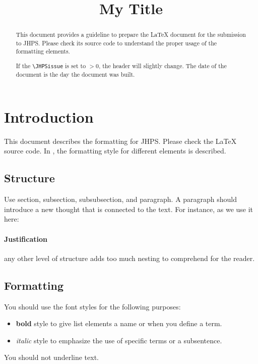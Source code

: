 \documentclass{jhps}
\begin{document}



\title{My Title}

\maketitle

\begin{abstract}
This document provides a guideline to prepare the LaTeX document for the submission to JHPS.
Please check its source code to understand the proper usage of the formatting elements.

If the \verb|\JHPSissue| is set to $>0$, the header will slightly change.
The date of the document is the day the document was built.
\end{abstract}

\section{Introduction}
\label{sec:intro}

This document describes the formatting for JHPS.
Please check the LaTeX source code.
In , the formatting style for different elements is described.

\subsection{Structure}

Use section, subsection, subsubsection, and paragraph.
A paragraph should introduce a new thought that is connected to the text.
For instance, as we use it here:

\paragraph{Justification} any other level of structure adds too much nesting to comprehend for the reader.

\subsection{Formatting}
You should use the font styles for the following purposes:
\begin{itemize}
  \item \textbf{bold} style to give list elements a name or when you define a term.
  \item \textit{italic} style to emphasize the use of specific terms or a subsentence.
\end{itemize}
You should not underline text.
\end{document}
